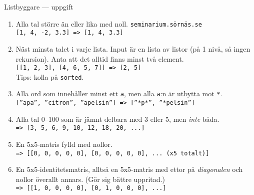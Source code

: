 \documentclass{beamer}
\begin{document}
  \begin{frame}{Listbyggare --- uppgift}

    \footnotesize

    \pause{}

    \begin{enumerate}[<+->]
      \item Alla tal större än eller lika med noll. \hfill{} \texttt{seminarium.sörnäs.se}\\
            \texttt{[1, 4, -2, 3.3] => [1, 4, 3.3]}

      \item Näst minsta talet i varje lista. Input är en lista av listor (på 1
            nivå, så ingen rekursion). Anta att det alltid finns minst två element. \\
            \texttt{[[1, 2, 3], [4, 6, 5, 7]] => [2, 5]} \\
            Tips: kolla på \texttt{sorted}.

      \item Alla ord som innehåller minst ett \texttt{a}, men alla \texttt{a}:n
            är utbytta mot \texttt{*}. \\
            \texttt{[''apa'', ''citron'', ''apelsin''] => [''*p*'', ''*pelsin'']}

      \item Alla tal 0--100 som är jämnt delbara med 3 eller 5, men
            \emph{inte} båda. \\
            \texttt{=> [3, 5, 6, 9, 10, 12, 18, 20, ...]}

      \item En 5x5-matris fylld med nollor. \\
            \texttt{=> [[0, 0, 0, 0, 0], [0, 0, 0, 0, 0], ... (x5 totalt)]}

      \item En 5x5-identitetsmatris, alltså en 5x5-matris med ettor på
            \emph{diagonalen} och nollor överallt annars. (Gör sig bättre uppritad.) \\
            \texttt{=> [[1, 0, 0, 0, 0], [0, 1, 0, 0, 0], ...]}


    \end{enumerate}

  \end{frame}
\end{document}
